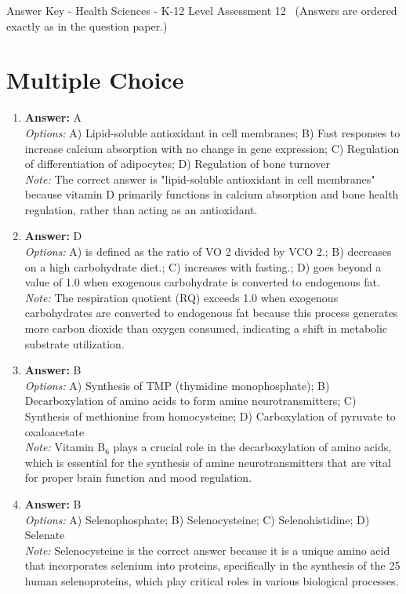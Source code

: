 \documentclass[12pt]{article}
\begin{document}
\begin{center}
Answer Key - Health Sciences - K-12 Level Assessment 12 \
\small (Answers are ordered exactly as in the question paper.)
\end{center}

\section*{Multiple Choice}
\begin{enumerate}[label=\arabic*.]
\item \textbf{Answer:} A
\\ \textit{Options:} A) Lipid-soluble antioxidant in cell membranes; B) Fast responses to increase calcium absorption with no change in gene expression; C) Regulation of differentiation of adipocytes; D) Regulation of bone turnover
\\ \textit{Note:} The correct answer is "lipid-soluble antioxidant in cell membranes" because vitamin D primarily functions in calcium absorption and bone health regulation, rather than acting as an antioxidant.
\item \textbf{Answer:} D
\\ \textit{Options:} A) is defined as the ratio of VO 2 divided by VCO 2.; B) decreases on a high carbohydrate diet.; C) increases with fasting.; D) goes beyond a value of 1.0 when exogenous carbohydrate is converted to endogenous fat.
\\ \textit{Note:} The respiration quotient (RQ) exceeds 1.0 when exogenous carbohydrates are converted to endogenous fat because this process generates more carbon dioxide than oxygen consumed, indicating a shift in metabolic substrate utilization.
\item \textbf{Answer:} B
\\ \textit{Options:} A) Synthesis of TMP (thymidine monophosphate); B) Decarboxylation of amino acids to form amine neurotransmitters; C) Synthesis of methionine from homocysteine; D) Carboxylation of pyruvate to oxaloacetate
\\ \textit{Note:} Vitamin B$_{6}$ plays a crucial role in the decarboxylation of amino acids, which is essential for the synthesis of amine neurotransmitters that are vital for proper brain function and mood regulation.
\item \textbf{Answer:} B
\\ \textit{Options:} A) Selenophosphate; B) Selenocysteine; C) Selenohistidine; D) Selenate
\\ \textit{Note:} Selenocysteine is the correct answer because it is a unique amino acid that incorporates selenium into proteins, specifically in the synthesis of the 25 human selenoproteins, which play critical roles in various biological processes.

\end{enumerate}
\end{document}
